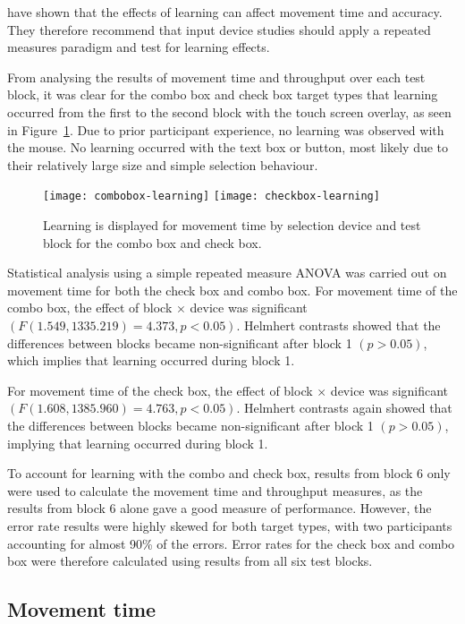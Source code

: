 \documentclass{elsart}
\begin{document}
\citet{Doug-SA-1999-CHI} have shown that the effects of learning can
affect movement time and accuracy. They therefore recommend that input
device studies should apply a repeated measures paradigm and test for
learning effects.

From analysing the results of movement time and throughput over each
test block, it was clear for the combo box and check box target types
that learning occurred from the first to the second block with the touch
screen overlay, as seen in Figure~\ref{fig-movement-time-learning}. Due
to prior participant experience, no learning was observed with the
mouse. No learning occurred with the text box or button, most likely due
to their relatively large size and simple selection behaviour.


\begin{figure}
	\centering
	\texttt{[image: combobox-learning]}
	\texttt{[image: checkbox-learning]}
	\caption{Learning is displayed for movement time by selection device
	and test block for the combo box and check box.}
	\label{fig-movement-time-learning}
\end{figure}


Statistical analysis using a simple repeated measure ANOVA was carried
out on movement time for both the check box and combo box. For movement
time of the combo box, the effect of block \(\times\) device was
significant \((F(1.549, 1335.219) = 4.373, p < 0.05)\). Helmhert
contrasts showed that the differences between blocks became
non-significant after block 1 \((p > 0.05)\), which implies that
learning occurred during block 1.

For movement time of the check box, the effect of block \(\times\)
device was significant \((F(1.608, 1385.960) = 4.763, p < 0.05)\).
Helmhert contrasts again showed that the differences between blocks
became non-significant after block 1 \((p > 0.05)\), implying that
learning occurred during block 1.

To account for learning with the combo and check box, results from block
6 only were used to calculate the movement time and throughput measures,
as the results from block 6 alone gave a good measure of performance.
However, the error rate results were highly skewed for both target
types, with two participants accounting for almost 90\% of the errors.
Error rates for the check box and combo box were therefore calculated
using results from all six test blocks.


\subsection{Movement time}
\label{sec-results-movement}
\end{document}
